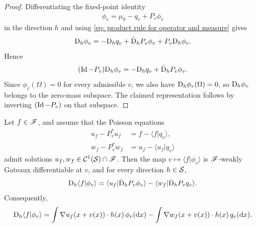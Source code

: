 \documentclass[twoside,10pt]{../jmlr}
\begin{document}
\begin{proof}
    Differentiating the fixed-point identity
    \begin{align}
        \phi_v=\mu_0-q_v+P_v\phi_v
    \end{align}
    in the direction $h$ and using \eqref{eq: product rule for operator and measure} gives
    \begin{align}
        \mathrm{D}_h\phi_v=-\mathrm{D}_h q_v+\bar{\mathrm{D}}_h P_v\phi_v+P_v\mathrm{D}_h\phi_v.
    \end{align}
    Hence
    \begin{align}
        (\operatorname{Id}-P_v)\mathrm{D}_h\phi_v=-\mathrm{D}_h q_v+\bar{\mathrm{D}}_h P_v\phi_v.
    \end{align}
    Since $\phi_v(\Omega)=0$ for every admissible $v$, we also have $\mathrm{D}_h\phi_v(\Omega)=0$, so $\mathrm{D}_h\phi_v$ belongs to the zero-mass subspace. The claimed representation follows by inverting $(\operatorname{Id}-P_v)$ on that subspace.
\end{proof}

\begin{theorem}\label{thm: transient policy gradient theorem}
    Let $f\in\mathscr{F}$, and assume that the Poisson equations
    \begin{align}
        u_f-P_v^*u_f&=f-\langle f\vert q_v\rangle,\\
        w_f-P_v^*w_f&=u_f-\langle u_f\vert q_v\rangle
    \end{align}
    admit solutions $u_f,w_f\in\mathcal{C}^1(\mathcal{S})\cap\mathscr{F}$. Then the map $v\mapsto \langle f\vert \phi_v\rangle$ is $\mathscr{F}$-weakly Gateaux differentiable at $v$, and for every direction $h\in\mathcal{S}$,
    \begin{align}
        \mathrm{D}_h\langle f\vert \phi_v\rangle
        =\langle u_f\vert \bar{\mathrm{D}}_h P_v\phi_v\rangle-\langle w_f\vert \bar{\mathrm{D}}_h P_v q_v\rangle.
    \end{align}
    Consequently,
    \begin{align}
        \mathrm{D}_h\langle f\vert \phi_v\rangle
        =\int \nabla u_f(x+v(x))\cdot h(x)\,\phi_v(\mathrm{d} x)
        -\int \nabla w_f(x+v(x))\cdot h(x)\,q_v(\mathrm{d} x).
    \end{align}
\end{theorem}
\end{document}

